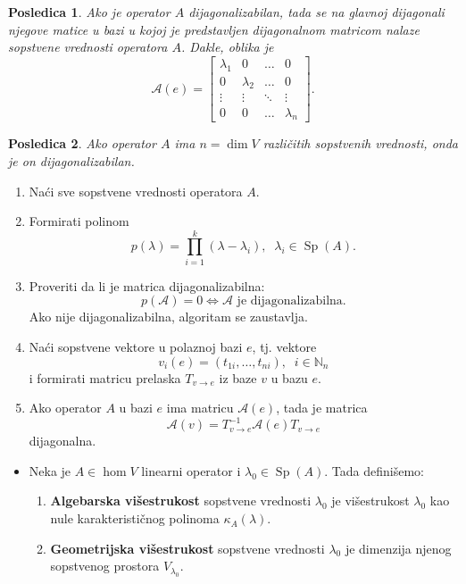 \documentclass[a4paper,12pt,twoside]{report}
\newtheorem{corollary}{Posledica}[theorem]
\numberwithin{algorithm}{section}
\begin{document}
\begin{corollary}
    Ako je operator $A$ dijagonalizabilan, tada se na glavnoj dijagonali njegove matice u 
bazi u kojoj je predstavljen dijagonalnom matricom nalaze sopstvene vrednosti operatora $A$. Dakle, oblika je
\[ \mathcal{A}(e) = \begin{bmatrix}
    \lambda_1 & 0 & \dots & 0 \\
    0 & \lambda_2 & \dots & 0 \\
    \vdots & \vdots & \ddots & \vdots \\
    0 & 0 & \dots & \lambda_n
\end{bmatrix}. \]
\end{corollary}

\begin{corollary}
    Ako operator $A$ ima $n = \dim V$ različitih sopstvenih vrednosti, onda je on dijagonalizabilan.
\end{corollary}

\begin{algorithm}[!h]
    \caption{Dijagonalizacija matrice}
    \begin{enumerate}
        \item Naći sve sopstvene vrednosti operatora $A$.
        \item Formirati polinom 
        \[ p(\lambda) = \prod_{i=1}^{k}(\lambda - \lambda_i), \;\; \lambda_i \in \operatorname{Sp}(A). \]
        \item Proveriti da li je matrica dijagonalizabilna:
        \[ p(\mathcal{A}) = 0 \iff \mathcal{A} \text{ je dijagonalizabilna.} \]
        Ako nije dijagonalizabilna, algoritam se zaustavlja.
        \item Naći sopstvene vektore u polaznoj bazi $e$, tj. vektore 
        \[v_i(e) = (t_{1i}, \dots, t_{ni}), \;\; i \in \mathbb{N}_n\]
        i formirati matricu prelaska $T_{v \to e}$ iz baze $v$ u bazu $e$.
        \item Ako operator $A$ u bazi $e$ ima matricu $\mathcal{A}(e)$, tada je matrica
        \[ \mathcal{A}(v) = T_{v \to e}^{-1}\mathcal{A}(e)T_{v \to e} \] dijagonalna.
    \end{enumerate}
\end{algorithm}
\newpage
\begin{itemize}
    \item Neka je $A \in \hom V$ linearni operator i $\lambda_0 \in \operatorname{Sp}(A)$. Tada definišemo:
    \begin{enumerate}
        \item \textbf{Algebarska višestrukost} sopstvene vrednosti $\lambda_0$ je višestrukost $\lambda_0$ kao nule karakterističnog
        polinoma $\kappa_{A}(\lambda)$.
        \item \textbf{Geometrijska višestrukost} sopstvene vrednosti $\lambda_0$ je dimenzija njenog sopstvenog prostora $V_{\lambda_0}$.
    \end{enumerate}
\end{itemize}
\end{document}
